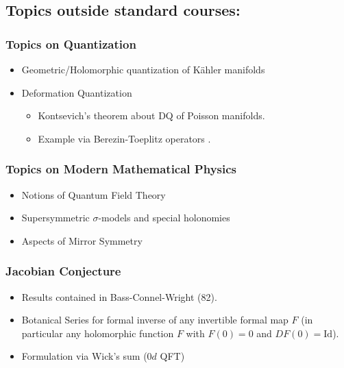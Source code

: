 \documentclass{article}
\begin{document}
\subsection*{Topics outside standard courses:}
\subsubsection*{Topics on Quantization}
\begin{itemize}
    \item Geometric/Holomorphic quantization of Kähler manifolds \cite{Schlichenmaier_2010}
    \item Deformation Quantization
    \begin{itemize}
        \item Kontsevich's theorem about DQ of Poisson manifolds. \cite{Kontsevich_2003}
        \item Example via Berezin-Toeplitz operators \cite{schlichenmaier1999deformationquantizationcompactkaehler}.
\end{itemize}
\end{itemize}
\subsubsection*{Topics on Modern Mathematical Physics \cite{QFT-Strings,Mirror}}
\begin{itemize}
    \item Notions of Quantum Field Theory
    \item Supersymmetric $\sigma$-models and special holonomies
    \item Aspects of Mirror Symmetry
\end{itemize}
\clearpage


\subsubsection*{Jacobian Conjecture \cite{BCW}}
\begin{itemize}
    \item Results contained in Bass-Connel-Wright (82). %
    \item Botanical Series for formal inverse of any invertible formal map $F$ (in particular any holomorphic function $F$ with $F(0)=0$ and $DF(0)=\mathrm{Id}$).
    \item Formulation via Wick's sum ($0d$ QFT) \cite{Abdesselam}
\end{itemize}
\end{document}
